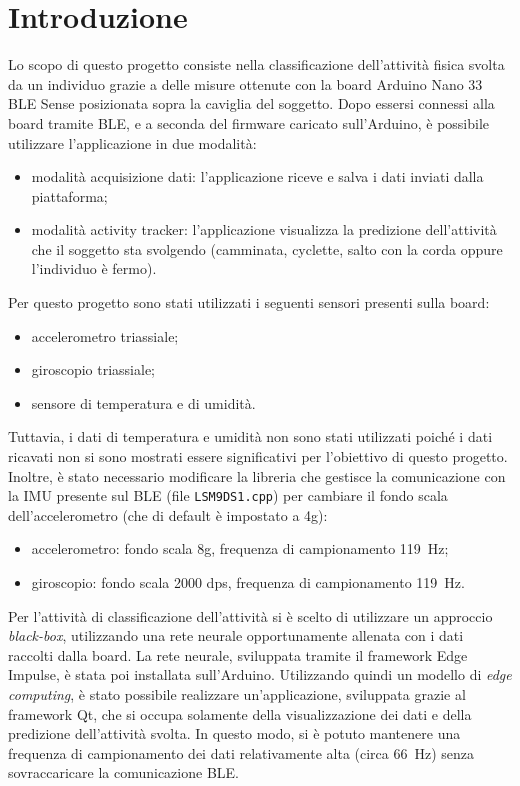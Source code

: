 \section{Introduzione}
Lo scopo di questo progetto consiste nella classificazione dell'attività fisica svolta da un individuo grazie a delle misure ottenute con la board Arduino Nano 33 BLE Sense posizionata sopra la caviglia del soggetto. Dopo essersi connessi alla board tramite BLE, e a seconda del firmware caricato sull'Arduino, è possibile utilizzare l'applicazione in due modalità:
\begin{itemize}
	\item modalità acquisizione dati: l'applicazione riceve e salva i dati inviati dalla piattaforma;
	\item modalità activity tracker: l'applicazione visualizza la predizione dell'attività che il soggetto sta svolgendo (camminata, cyclette, salto con la corda oppure l'individuo è fermo).
\end{itemize}
Per questo progetto sono stati utilizzati i seguenti sensori presenti sulla board:
\begin{itemize}
	\item accelerometro triassiale; 
	\item giroscopio triassiale;
	\item sensore di temperatura e di umidità.
\end{itemize}
Tuttavia, i dati di temperatura e umidità non sono stati utilizzati poiché i dati ricavati non si sono mostrati essere significativi per l'obiettivo di questo progetto. Inoltre, è stato necessario modificare la libreria che gestisce la comunicazione con la IMU presente sul BLE (file \texttt{LSM9DS1.cpp}) per cambiare il fondo scala dell'accelerometro (che di default è impostato a 4g):
\begin{itemize}
	\item accelerometro: fondo scala 8g, frequenza di campionamento \SI{119}{\hertz};
	\item giroscopio: fondo scala 2000 dps, frequenza di campionamento \SI{119}{\hertz}.
\end{itemize}

Per l'attività di classificazione dell'attività si è scelto di utilizzare un approccio \textit{black-box}, utilizzando una rete neurale opportunamente allenata con i dati raccolti dalla board. La rete neurale, sviluppata tramite il framework Edge Impulse, è stata poi installata sull'Arduino. Utilizzando quindi un modello di \textit{edge computing}, è stato possibile realizzare un'applicazione, sviluppata grazie al framework Qt, che si occupa solamente della visualizzazione dei dati e della predizione dell'attività svolta. In questo modo, si è potuto mantenere una frequenza di campionamento dei dati relativamente alta (circa \SI{66}{\hertz}) senza sovraccaricare la comunicazione BLE.
